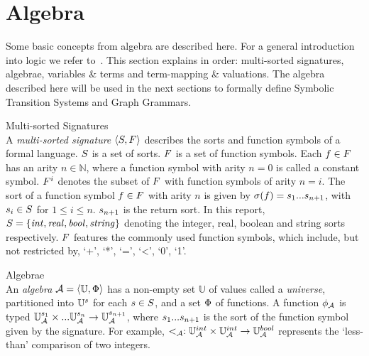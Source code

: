 \section{Algebra}\label{sec:algebra}

Some basic concepts from algebra are described here. For a general introduction into logic we refer to~\cite{Huth:logic}. This section explains in order: multi-sorted signatures, algebrae, variables \& terms and term-mapping \& valuations. The algebra described here will be used in the next sections to formally define Symbolic Transition Systems and Graph Grammars.

\vspace{10px}\begin{definition} Multi-sorted Signatures \\
A \textit{multi-sorted signature} $\langle S, F \rangle$ describes the sorts and function symbols of a formal language. $S$ is a set of sorts. $F$ is a set of function symbols. Each $f \in F$ has an arity $n \in \mathbb{N}$, where a function symbol with arity $n = 0$ is called a constant symbol. $F^i$ denotes the subset of $F$ with function symbols of arity $n = i$. The sort of a function symbol $f \in F$ with arity $n$ is given by $\sigma(f) = s_1 ... s_{n+1}$, with $s_i \in S$ for $1 \leq i \leq n$. $s_{n+1}$ is the return sort. In this report, $S =  \{\mathit{int, real, bool, string}\}$ denoting the integer, real, boolean and string sorts respectively. $F$ features the commonly used function symbols, which include, but not restricted by, `+', `*', `=', `<', `0', `1'.
\end{definition}

\vspace{10px}
\begin{definition} Algebrae \\
An \textit{algebra} $\mathcal{A} = \langle \mathbb{U}, \Phi\rangle$ has a non-empty set $\mathbb{U}$ of values called a \textit{universe}, partitioned into $\mathbb{U}^s$ for each $s \in S$, and a set $\Phi$ of functions. A function $\phi_{\mathcal{A}}$ is typed $\mathbb{U}_{\mathcal{A}}^{s_1} \times ... \mathbb{U}_{\mathcal{A}}^{s_n} \rightarrow \mathbb{U}_{\mathcal{A}}^{s_{n+1}}$, where $s_1 ... s_{n+1}$ is the sort of the function symbol given by the signature. For example, $<_{\mathcal{A}}: \mathbb{U}_{\mathcal{A}}^{int} \times \mathbb{U}_{\mathcal{A}}^{int} \rightarrow \mathbb{U}_{\mathcal{A}}^{bool}$ represents the `less-than' comparison of two integers.
\end{definition}

